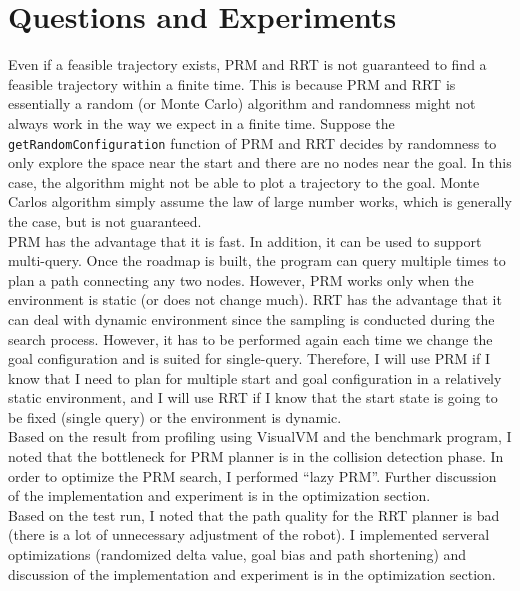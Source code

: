 \documentclass[9.5pt]{extarticle}
\begin{document}
\section{Questions and Experiments}

Even if a feasible trajectory exists, PRM and RRT is not guaranteed to find a feasible trajectory within a finite time. This is because PRM and RRT is essentially a random (or Monte Carlo) algorithm and randomness might not always work in the way we expect in a finite time. Suppose the \verb`getRandomConfiguration` function of PRM and RRT decides by randomness to only explore the space near the start and there are no nodes near the goal. In this case, the algorithm might not be able to plot a trajectory to the goal. Monte Carlos algorithm simply assume the law of large number works, which is generally the case, but is not guaranteed.\\

PRM has the advantage that it is fast. In addition, it can be used to support multi-query. Once the roadmap is built, the program can query multiple times to plan a path connecting any two nodes. However, PRM works only when the environment is static (or does not change much). RRT has the advantage that it can deal with dynamic environment since the sampling is conducted during the search process. However, it has to be performed again each time we change the  goal configuration and is suited for single-query. Therefore, I will use PRM if I know that I need to plan for multiple start and goal configuration in a relatively static environment, and I will use RRT if I know that the start state  is going to be fixed (single query) or the environment is dynamic.\\
  
Based on the result from profiling using VisualVM and the benchmark program, I noted that the bottleneck for PRM planner is in the collision detection phase. In order to optimize the PRM search, I performed ``lazy PRM''. Further discussion of the implementation and experiment is in the optimization section.\\

Based on the test run, I noted that the path quality for the RRT planner is bad (there is a lot of unnecessary adjustment of the robot). I implemented serveral optimizations (randomized delta value, goal bias and path shortening) and discussion of the implementation and experiment is in the optimization section.\\
\end{document}
